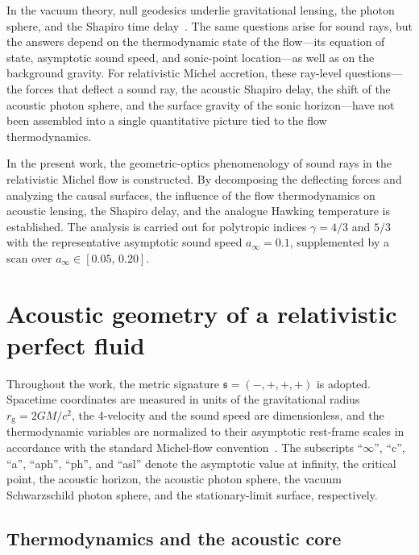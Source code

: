 \documentclass[12pt,a4paper,preprint]{elsarticle}
\begin{document}
        In the vacuum theory, null geodesics underlie gravitational lensing, the photon sphere, and the Shapiro time delay~\cite{ShapiroII_FourthTestOfGeneralRelativity_1964}. The same questions arise for sound rays, but the answers depend on the thermodynamic state of the flow---its equation of state, asymptotic sound speed, and sonic-point location---as well as on the background gravity. For relativistic Michel accretion, these ray-level questions---the forces that deflect a sound ray, the acoustic Shapiro delay, the shift of the acoustic photon sphere, and the surface gravity of the sonic horizon---have not been assembled into a single quantitative picture tied to the flow thermodynamics.
        
        In the present work, the geometric-optics phenomenology of sound rays in the relativistic Michel flow is constructed. By decomposing the deflecting forces and analyzing the causal surfaces, the influence of the flow thermodynamics on acoustic lensing, the Shapiro delay, and the analogue Hawking temperature is established. The analysis is carried out for polytropic indices $\gamma=4/3$ and $5/3$ with the representative asymptotic sound speed $a_{\infty}=0.1$, supplemented by a scan over $a_{\infty}\in[0.05,\,0.20]$.

    \section{Acoustic geometry of a relativistic perfect fluid}\label{sec:acoustic-geometry-fluid}

        Throughout the work, the metric signature $\mathfrak{s}=(-,+,+,+)$ is adopted. Spacetime coordinates are measured in units of the gravitational radius $r_{\mathrm{g}}=2GM/c^{2}$, the 4-velocity and the sound speed are dimensionless, and the thermodynamic variables are normalized to their asymptotic rest-frame scales in accordance with the standard Michel-flow convention~\cite{MichelFC_AccretionOfMatterByCondensedObjects_1972, MoncriefV_StabilityOfStationarySphericalAccretionOntoASchwarzschildBlackHole_1980}. The subscripts ``$\infty$'', ``c'', ``a'', ``aph'', ``ph'', and ``asl'' denote the asymptotic value at infinity, the critical point, the acoustic horizon, the acoustic photon sphere, the vacuum Schwarzschild photon sphere, and the stationary-limit surface, respectively.

        \subsection{Thermodynamics and the acoustic core}\label{subsec:acoustic-core}
\end{document}
